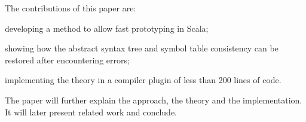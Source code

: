 The contributions of this paper are:
\begin{packed_item}
\item developing a method to allow fast prototyping in Scala;
\item showing how the abstract syntax tree and symbol table consistency can be restored after encountering errors;
\item implementing the theory in a compiler plugin of less than 200 lines of code.
\end{packed_item}

The paper will further explain the approach, the theory and the implementation. It will later present related work and conclude.